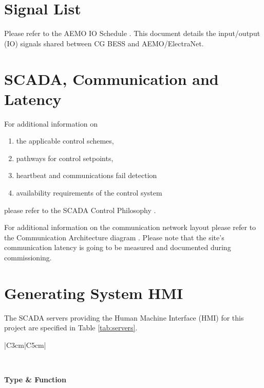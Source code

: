 \documentclass{../grid-link-report}
\begin{document}
	\chapter{Signal List}
	Please refer to the AEMO IO Schedule \cite{aemo-io}. This document details the input/output (IO) signals shared between CG BESS and AEMO/ElectraNet.
	
	\chapter{SCADA, Communication and Latency}
	For additional information on 
	\begin{enumerate}
		\item the applicable control schemes,
		\item pathways for control setpoints,
		\item heartbeat and communications fail detection
		\item availability requirements of the control system
	\end{enumerate}
	
	please refer to the SCADA Control Philosophy \cite{scada-philo}.
	
	For additional information on the communication network layout please refer to the Communication Architecture diagram \cite{comms-arch}. Please note that the site's communication latency is going to be measured and documented during commissioning.
	
	
	
	\chapter{Generating System HMI}
	The SCADA servers providing the Human Machine Interface (HMI) for this project are specified in Table \ref{tab:servers}.
	{
	\thicktablelines
	\begin{longtable}{|C{3cm}|C{5cm}|} 
		\caption{SCADA Server Details}
		\label{tab:servers}
		\\	
		\toprule
		
		\bfseries \color{white}Type & \bfseries \color{white}Function\\
		\endhead
		\bottomrule \endfoot
		\\\hline
	\end{longtable}
	}
	
\end{document}
